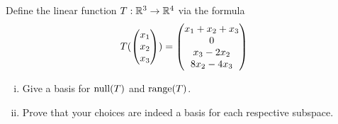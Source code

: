 \begin{question}
    \normalfont
    Define the linear function $T:\mathbb R^3\rightarrow\mathbb R^4$ via the formula 
    \[
        \begin{aligned}
            T(\begin{pmatrix} x_1\\ x_2\\ x_3\end{pmatrix})=\begin{pmatrix} x_1+x_2+x_3\\ 0\\x_3-2x_2 \\ 8x_2-4x_3\end{pmatrix}
        \end{aligned}
    \]
    \begin{enumerate}[(i)]
        \item Give a basis for $\textnormal{null}(T)$ and $\textnormal{range}(T)$.
        \item Prove that your choices are indeed a basis for each respective subspace.
    \end{enumerate}
    
\end{question}